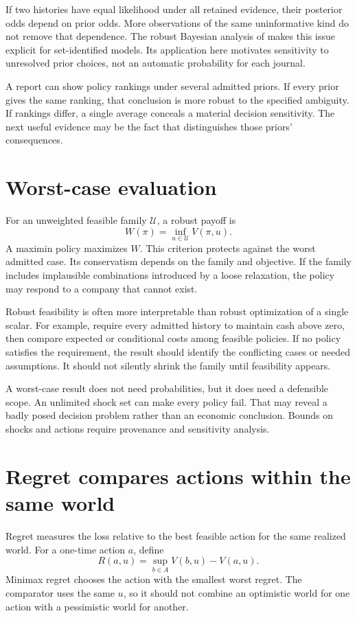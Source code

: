 If two histories have equal likelihood under all retained evidence, their posterior odds depend on prior odds. More observations of the same uninformative kind do not remove that dependence. The robust Bayesian analysis of \citet{giacomini2021} makes this issue explicit for set-identified models. Its application here motivates sensitivity to unresolved prior choices, not an automatic probability for each journal.

A report can show policy rankings under several admitted priors. If every prior gives the same ranking, that conclusion is more robust to the specified ambiguity. If rankings differ, a single average conceals a material decision sensitivity. The next useful evidence may be the fact that distinguishes those priors' consequences.

\section{Worst-case evaluation}
For an unweighted feasible family $\mathcal U$, a robust payoff is
\begin{equation}
 W(\pi)=\inf_{u\in\mathcal U}V(\pi,u).
\end{equation}
A maximin policy maximizes $W$. This criterion protects against the worst admitted case. Its conservatism depends on the family and objective. If the family includes implausible combinations introduced by a loose relaxation, the policy may respond to a company that cannot exist.

Robust feasibility is often more interpretable than robust optimization of a single scalar. For example, require every admitted history to maintain cash above zero, then compare expected or conditional costs among feasible policies. If no policy satisfies the requirement, the result should identify the conflicting cases or needed assumptions. It should not silently shrink the family until feasibility appears.

A worst-case result does not need probabilities, but it does need a defensible scope. An unlimited shock set can make every policy fail. That may reveal a badly posed decision problem rather than an economic conclusion. Bounds on shocks and actions require provenance and sensitivity analysis.

\section{Regret compares actions within the same world}
Regret measures the loss relative to the best feasible action for the same realized world. For a one-time action $a$, define
\begin{equation}
 R(a,u)=\sup_{b\in A}V(b,u)-V(a,u).
\end{equation}
Minimax regret chooses the action with the smallest worst regret. The comparator uses the same $u$, so it should not combine an optimistic world for one action with a pessimistic world for another.

